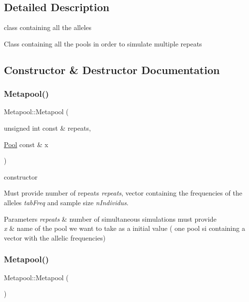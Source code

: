 \subsection{Detailed Description}
class containing all the alleles 

Class containing all the pools in order to simulate multiple repeats 

\subsection{Constructor \& Destructor Documentation}
\hypertarget{class_metapool_a40f55ee361d80463bb5f8afac39000d9}{}\label{class_metapool_a40f55ee361d80463bb5f8afac39000d9} 
\subsubsection{\texorpdfstring{Metapool()}{Metapool()}\hspace{0.1cm}{\footnotesize\ttfamily [1/2]}}
{\footnotesize\ttfamily Metapool\+::\+Metapool (\begin{DoxyParamCaption}\item[{unsigned int const \&}]{repeats,  }\item[{\hyperlink{class_pool}{Pool} const \&}]{x }\end{DoxyParamCaption})}



constructor 

Must provide number of repeats {\itshape repeats}, vector containing the frequencies of the alleles {\itshape tab\+Freq} and sample size {\itshape n\+Individus}. 
\begin{DoxyParams}{Parameters}
{\em repeats} & number of simultaneous simulations must provide \\
\hline
{\em x} & name of the pool we want to take as a initial value ( one pool si containing a vector with the allelic frequencies) \\
\hline
\end{DoxyParams}
\hypertarget{class_metapool_a727b9683d9b15b0d07a0a83ce25bbdcd}{}\label{class_metapool_a727b9683d9b15b0d07a0a83ce25bbdcd} 
\subsubsection{\texorpdfstring{Metapool()}{Metapool()}\hspace{0.1cm}{\footnotesize\ttfamily [2/2]}}
{\footnotesize\ttfamily Metapool\+::\+Metapool (\begin{DoxyParamCaption}{ }\end{DoxyParamCaption})\hspace{0.3cm}{\ttfamily [default]}}



